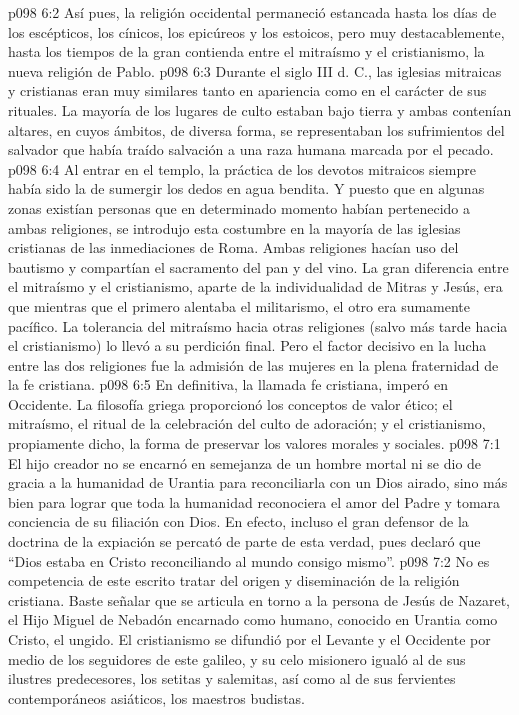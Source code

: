 \vs p098 6:2 Así pues, la religión occidental permaneció estancada hasta los días de los escépticos, los cínicos, los epicúreos y los estoicos, pero muy destacablemente, hasta los tiempos de la gran contienda entre el mitraísmo y el cristianismo, la nueva religión de Pablo.
\vs p098 6:3 \pc Durante el siglo III d. C., las iglesias mitraicas y cristianas eran muy similares tanto en apariencia como en el carácter de sus rituales. La mayoría de los lugares de culto estaban bajo tierra y ambas contenían altares, en cuyos ámbitos, de diversa forma, se representaban los sufrimientos del salvador que había traído salvación a una raza humana marcada por el pecado.
\vs p098 6:4 Al entrar en el templo, la práctica de los devotos mitraicos siempre había sido la de sumergir los dedos en agua bendita. Y puesto que en algunas zonas existían personas que en determinado momento habían pertenecido a ambas religiones, se introdujo esta costumbre en la mayoría de las iglesias cristianas de las inmediaciones de Roma. Ambas religiones hacían uso del bautismo y compartían el sacramento del pan y del vino. La gran diferencia entre el mitraísmo y el cristianismo, aparte de la individualidad de Mitras y Jesús, era que mientras que el primero alentaba el militarismo, el otro era sumamente pacífico. La tolerancia del mitraísmo hacia otras religiones (salvo más tarde hacia el cristianismo) lo llevó a su perdición final. Pero el factor decisivo en la lucha entre las dos religiones fue la admisión de las mujeres en la plena fraternidad de la fe cristiana.
\vs p098 6:5 \pc En definitiva, la llamada fe cristiana, imperó en Occidente. La filosofía griega proporcionó los conceptos de valor ético; el mitraísmo, el ritual de la celebración del culto de adoración; y el cristianismo, propiamente dicho, la forma de preservar los valores morales y sociales.
\vs p098 7:1 El hijo creador no se encarnó en semejanza de un hombre mortal ni se dio de gracia a la humanidad de Urantia para reconciliarla con un Dios airado, sino más bien para lograr que toda la humanidad reconociera el amor del Padre y tomara conciencia de su filiación con Dios. En efecto, incluso el gran defensor de la doctrina de la expiación se percató de parte de esta verdad, pues declaró que “Dios estaba en Cristo reconciliando al mundo consigo mismo”.
\vs p098 7:2 No es competencia de este escrito tratar del origen y diseminación de la religión cristiana. Baste señalar que se articula en torno a la persona de Jesús de Nazaret, el Hijo Miguel de Nebadón encarnado como humano, conocido en Urantia como Cristo, el ungido. El cristianismo se difundió por el Levante y el Occidente por medio de los seguidores de este galileo, y su celo misionero igualó al de sus ilustres predecesores, los setitas y salemitas, así como al de sus fervientes contemporáneos asiáticos, los maestros budistas.
